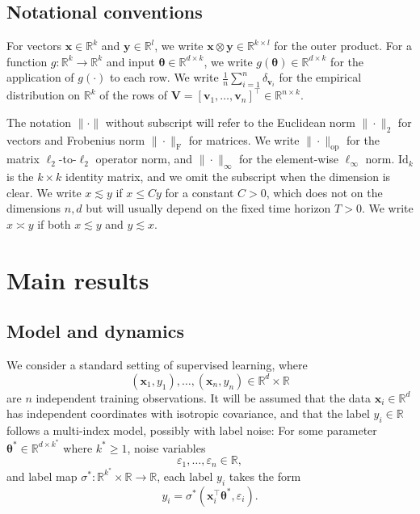 \documentclass[11pt,letterpaper,reqno]{amsart}
\theoremstyle{definition}
\def\eps{\varepsilon}
\def\R{\mathbb{R}}
\def\Id{\mathrm{Id}}
\def\op{\mathrm{op}}
\def\sF{\mathrm{F}}
\def\v{\mathbf{v}}
\def\x{\mathbf{x}}
\def\y{\mathbf{y}}
\def\V{\mathbf{V}}
\def\btheta{\boldsymbol{\theta}}
\begin{document}
\subsection*{Notational conventions} For vectors $\x \in \R^k$ and $\y \in \R^l$,
we write $\x \otimes \y \in \R^{k \times l}$ for the outer product. For a
function $g:\R^k \to \R^k$ and input $\btheta \in \R^{d \times k}$, we 
write $g(\btheta) \in \R^{d \times k}$ for the application of $g(\cdot)$
to each row. We write $\frac{1}{n}\sum_{i=1}^n \delta_{\v_i}$ for the empirical
distribution on $\R^k$ of the rows of
$\V=[\v_1,\ldots,\v_n]^\top \in \R^{n \times k}$.

The notation
$\|\cdot\|$ without subscript will refer to the Euclidean norm $\|\cdot\|_2$ for
vectors and Frobenius norm $\|\cdot\|_\sF$ for matrices. We write
$\|\cdot\|_\op$ for the matrix $\ell_2$-to-$\ell_2$ operator norm, and
$\|\cdot\|_\infty$ for the element-wise $\ell_\infty$ norm. $\Id_k$ is the $k
\times k$ identity matrix, and we omit the subscript when the dimension is
clear. We write $x \lesssim
y$ if $x \leq Cy$ for a constant $C>0$, which does not on the dimensions $n,d$ but will usually depend on the fixed
time horizon $T>0$. We write $x \asymp y$ if
both $x \lesssim y$ and $y \lesssim x$.

\section{Main results}\label{sec:results}

\subsection{Model and dynamics}\label{sec:model}

We consider a standard setting of supervised learning, where
\[(\x_1,y_1),\ldots,(\x_n,y_n) \in \R^d \times \R\]
are $n$ independent training observations. It will be assumed that the data
$\x_i \in \R^d$ has independent coordinates with isotropic covariance, and
that the label $y_i \in \R$ follows a multi-index model, possibly with label
noise: For some parameter $\btheta^* \in \R^{d \times k^*}$ where $k^* \geq 1$,
noise variables
\[\eps_1,\ldots,\eps_n \in \R,\]
and label map $\sigma^*:\R^{k^*} \times \R \to \R$, each label $y_i$
takes the form
\begin{equation}\label{eq:multiindex}
y_i=\sigma^*(\x_i^\top \btheta^*,\eps_i).
\end{equation}
\end{document}
